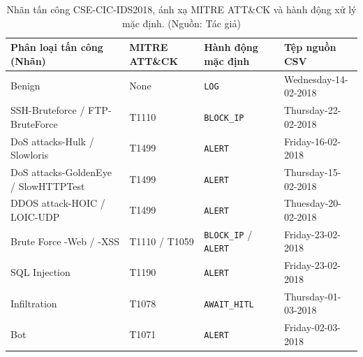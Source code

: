 \begin{table}[!htbp]
    \centering
    \caption{Nhãn tấn công CSE-CIC-IDS2018, ánh xạ MITRE ATT\&CK và hành động xử lý mặc định. (Nguồn: Tác giả)}
    \label{tab:dataset_distribution}
    \begin{tabular}{|>{\raggedright\arraybackslash}p{}|>{\centering\arraybackslash}p{}|>{\centering\arraybackslash}p{}|>{\raggedright\arraybackslash}p{}|}
        \hline
        \textbf{Phân loại tấn công (Nhãn)} & \textbf{MITRE ATT\&CK} & \textbf{Hành động mặc định} & \textbf{Tệp nguồn CSV} \\
        \hline
        Benign & None & \texttt{LOG} & Wednesday-14-02-2018 \\
        \hline
        SSH-Bruteforce / FTP-BruteForce & T1110 & \texttt{BLOCK\_IP} & Thursday-22-02-2018 \\
        \hline
        DoS attacks-Hulk / Slowloris & T1499 & \texttt{ALERT} & Friday-16-02-2018 \\
        \hline
        DoS attacks-GoldenEye / SlowHTTPTest & T1499 & \texttt{ALERT} & Thursday-15-02-2018 \\
        \hline
        DDOS attack-HOIC / LOIC-UDP & T1499 & \texttt{ALERT} & Thuesday-20-02-2018 \\
        \hline
        Brute Force -Web / -XSS & T1110 / T1059 & \texttt{BLOCK\_IP} / \texttt{ALERT} & Friday-23-02-2018 \\
        \hline
        SQL Injection & T1190 & \texttt{ALERT} & Friday-23-02-2018 \\
        \hline
        Infiltration & T1078 & \texttt{AWAIT\_HITL} & Thursday-01-03-2018 \\
        \hline
        Bot & T1071 & \texttt{ALERT} & Friday-02-03-2018 \\
        \hline
    \end{tabular}
\end{table}

